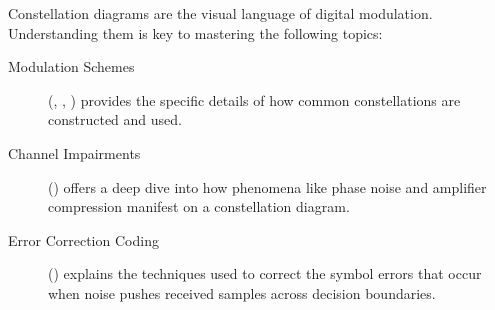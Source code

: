 \begin{importantbox}[title={Further Reading}]
    Constellation diagrams are the visual language of digital modulation. Understanding them is key to mastering the following topics:
    \begin{description}
        \item[Modulation Schemes] (, , ) provides the specific details of how common constellations are constructed and used.
        \item[Channel Impairments] () offers a deep dive into how phenomena like phase noise and amplifier compression manifest on a constellation diagram.
        \item[Error Correction Coding] () explains the techniques used to correct the symbol errors that occur when noise pushes received samples across decision boundaries.
    \end{description}
\end{importantbox}
